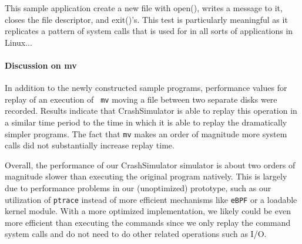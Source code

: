 This sample application create a new file with open(), writes a message to it, closes the file descriptor, and
exit()'s. This test is particularly meaningful as it replicates a pattern of system calls that is used for in
all sorts of applications in Linux...

\paragraph{Discussion on mv}

In addition to the newly constructed sample programs, performance values for replay of an execution of {\tt
  mv} moving a file between two separate disks were recorded.  Results indicate that CrashSimulator is able to
replay this operation in a similar time period to the time in which it is able to replay the dramatically
simpler programs.  The fact that {\tt mv} makes an order of magnitude more system calls did not substantially
increase replay time.


Overall, the performance of our CrashSimulator simulator is about two orders of
magnitude slower than executing the original program natively.  This is 
largely due to performance problems in our (unoptimized) prototype, such as
our utilization of {\tt ptrace} instead of more efficient mechanisms like
{\tt eBPF} or a loadable kernel module.  With a more optimized
implementation, we likely could be even more efficient than executing the
commands since we only replay the command system calls and do not need to
do other related operations such as I/O.
